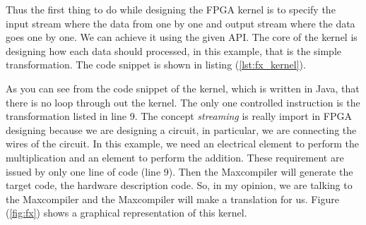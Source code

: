 \begin{figure}
  \centering
  
\end{figure}

Thus the first thing to do while designing the FPGA kernel is to specify
the input stream where the data from one by one and output stream where the
data goes one by one. We can achieve it using the given API. The core of
the kernel is designing how each data should processed, in this example,
that is the simple transformation. The code snippet is shown in listing
(\ref{lst:fx_kernel}).

\begin{figure}
  \centering
  
\end{figure}

As you can see from the code snippet of the kernel, which is written in
Java, that there is no loop through out the kernel. The only one controlled
instruction is the transformation listed in line 9. The concept
\emph{streaming} is really import in FPGA designing because we are
designing a circuit, in particular, we are connecting the wires of the
circuit. In this example, we need an electrical element to perform the
multiplication and an element to perform the addition. These requirement
are issued by only one line of code (line 9). Then the Maxcompiler will
generate the target code, the hardware description code. So, in my
opinion, we are talking to the Maxcompiler and the Maxcompiler will make
a translation for us. Figure (\ref{fig:fx}) shows a graphical representation
of this kernel.

